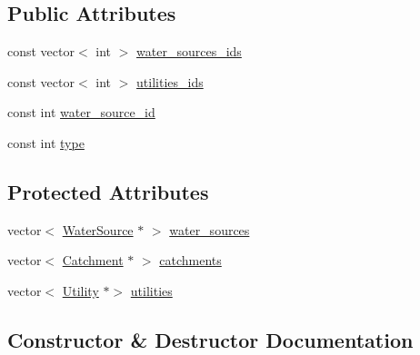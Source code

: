 \subsection*{Public Attributes}
\begin{DoxyCompactItemize}
\item 
const vector$<$ int $>$ \mbox{\hyperlink{classMinEnvFlowControl_a775d6408e5c581754ee4240eea68abdc}{water\+\_\+sources\+\_\+ids}}
\item 
const vector$<$ int $>$ \mbox{\hyperlink{classMinEnvFlowControl_a5c67ab20c181a1d22e4bf94e398451fc}{utilities\+\_\+ids}}
\item 
const int \mbox{\hyperlink{classMinEnvFlowControl_aada518a047598f386daec1d0358023aa}{water\+\_\+source\+\_\+id}}
\item 
const int \mbox{\hyperlink{classMinEnvFlowControl_abc3f168cd1ec36ba59e4b8604dfae8ec}{type}}
\end{DoxyCompactItemize}
\subsection*{Protected Attributes}
\begin{DoxyCompactItemize}
\item 
vector$<$ \mbox{\hyperlink{classWaterSource}{Water\+Source}} $\ast$ $>$ \mbox{\hyperlink{classMinEnvFlowControl_a36b50d0e6887b956051ae53bf5d2e3a9}{water\+\_\+sources}}
\item 
vector$<$ \mbox{\hyperlink{classCatchment}{Catchment}} $\ast$ $>$ \mbox{\hyperlink{classMinEnvFlowControl_a99502573f30daf84d9ad7a2f62197b77}{catchments}}
\item 
vector$<$ \mbox{\hyperlink{classUtility}{Utility}} $\ast$$>$ \mbox{\hyperlink{classMinEnvFlowControl_a1a0a309138b35e8199c205efb5fb5f80}{utilities}}
\end{DoxyCompactItemize}


\subsection{Constructor \& Destructor Documentation}
\mbox{\label{classMinEnvFlowControl_a093b292294d85f426c38deb6b7537d81}} 
